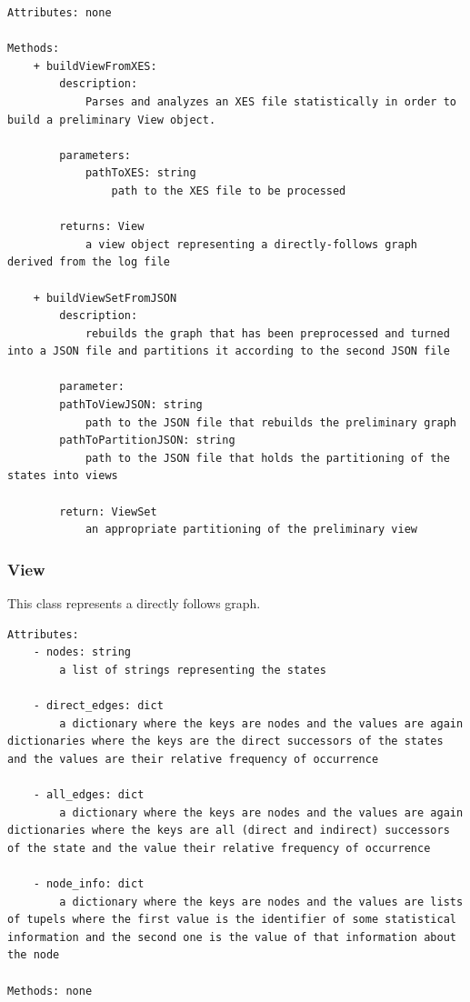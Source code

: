 \documentclass[12pt]{extarticle}
\begin{document}
\begin{lstlisting}
Attributes: none

Methods:
    + buildViewFromXES:
        description: 
            Parses and analyzes an XES file statistically in order to build a preliminary View object.
        
        parameters:
            pathToXES: string
                path to the XES file to be processed
       
        returns: View
            a view object representing a directly-follows graph derived from the log file
            
    + buildViewSetFromJSON
        description:
            rebuilds the graph that has been preprocessed and turned into a JSON file and partitions it according to the second JSON file
            
        parameter:
        pathToViewJSON: string
            path to the JSON file that rebuilds the preliminary graph
        pathToPartitionJSON: string 
            path to the JSON file that holds the partitioning of the states into views
        
        return: ViewSet
            an appropriate partitioning of the preliminary view 
\end{lstlisting}

\subsubsection{View}

This class represents a directly follows graph.


\begin{lstlisting}
Attributes:
    - nodes: string   
        a list of strings representing the states
        
    - direct_edges: dict
        a dictionary where the keys are nodes and the values are again dictionaries where the keys are the direct successors of the states and the values are their relative frequency of occurrence
        
    - all_edges: dict    
        a dictionary where the keys are nodes and the values are again dictionaries where the keys are all (direct and indirect) successors of the state and the value their relative frequency of occurrence
    
    - node_info: dict
        a dictionary where the keys are nodes and the values are lists of tupels where the first value is the identifier of some statistical information and the second one is the value of that information about the node

Methods: none
\end{lstlisting}
\end{document}

